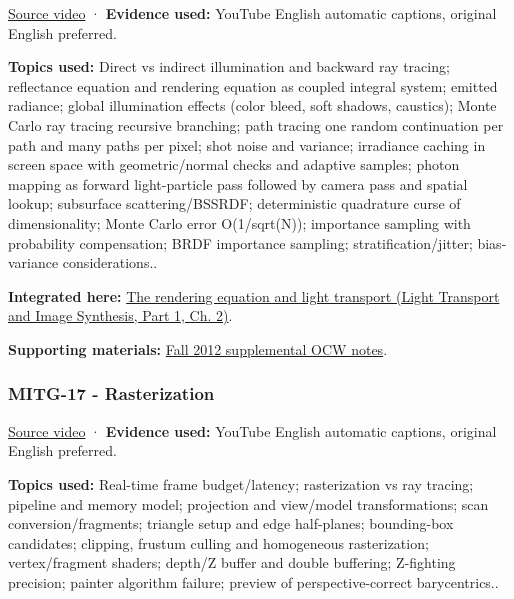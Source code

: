 \href{https://www.youtube.com/watch?v=xjBwPxU7tUk}{Source video} · \textbf{Evidence used:} YouTube English automatic captions, original English preferred.

\textbf{Topics used:} Direct vs indirect illumination and backward ray tracing; reflectance equation and rendering equation as coupled integral system; emitted radiance; global illumination effects (color bleed, soft shadows, caustics); Monte Carlo ray tracing recursive branching; path tracing one random continuation per path and many paths per pixel; shot noise and variance; irradiance caching in screen space with geometric/normal checks and adaptive samples; photon mapping as forward light-particle pass followed by camera pass and spatial lookup; subsurface scattering/BSSRDF; deterministic quadrature curse of dimensionality; Monte Carlo error O(1/sqrt(N)); importance sampling with probability compensation; BRDF importance sampling; stratification/jitter; bias-variance considerations..

\textbf{Integrated here:} \href{../04-Light-Transport-and-Image-Synthesis-P01/main.pdf\#nameddest=03-visual-computing-i-ch007-the-rendering-equation-and-light-transport}{The rendering equation and light transport (Light Transport and Image Synthesis, Part 1, Ch. 2)}.

\textbf{Supporting materials:} \href{https://ocw.mit.edu/courses/6-837-computer-graphics-fall-2012/pages/lecture-notes/}{Fall 2012 supplemental OCW notes}.

\subsubsection{MITG-17 - Rasterization}\label{04-visual-computing-ii-ch036-mitg-17---rasterization}

\hypertarget{04-visual-computing-ii-ch036-mitg-17---rasterization}{}

\href{https://www.youtube.com/watch?v=aCTEiX59ERM}{Source video} · \textbf{Evidence used:} YouTube English automatic captions, original English preferred.

\textbf{Topics used:} Real-time frame budget/latency; rasterization vs ray tracing; pipeline and memory model; projection and view/model transformations; scan conversion/fragments; triangle setup and edge half-planes; bounding-box candidates; clipping, frustum culling and homogeneous rasterization; vertex/fragment shaders; depth/Z buffer and double buffering; Z-fighting precision; painter algorithm failure; preview of perspective-correct barycentrics..

